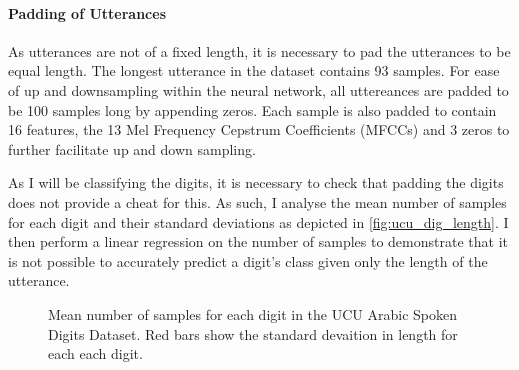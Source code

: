 \paragraph{Padding of Utterances}
As utterances are not of a fixed length, it is necessary to pad the utterances to be equal length. The longest utterance in the dataset contains 93 samples. For ease of up and downsampling within the neural network, all uttereances are padded to be 100 samples long by appending zeros. Each sample is also padded to contain 16 features, the 13 Mel Frequency Cepstrum Coefficients (MFCCs) and 3 zeros to further facilitate up and down sampling.

As I will be classifying the digits, it is necessary to check that padding the digits does not provide a cheat for this. As such, I analyse the mean number of samples for each digit and their standard deviations as depicted in \autoref{fig:ucu_dig_length}. I then perform a linear regression on the number of samples to demonstrate that it is not possible to accurately predict a digit's class given only the length of the utterance.

\begin{figure}
\centering
{}

	\caption{Mean number of samples for each digit in the UCU Arabic Spoken Digits Dataset. Red bars show the standard devaition in length for each each digit.}
	\label{fig:ucu_dig_length}

\end{figure}

